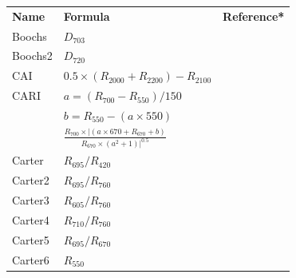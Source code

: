 \documentclass[letterpaper, peerreview, draftcls]{IEEEtran}
\begin{document}
\begingroup\scriptsize
\setlength\tabcolsep{4pt}  %
\begin{xtabular*}{0.3\textwidth}{lll}
	\bfseries{Name} & \bfseries{Formula}                                                                                  & \bfseries{Reference*}      \\
	Boochs          & $D_{703}$                                                                                           & \cite{boochs1990}       \\
	Boochs2         & $D_{720}$                                                                                           & \cite{boochs1990}       \\
	CAI             & $0.5 \times (R_{2000} + R_{2200}) -R_{2100}$                                                        & \cite{nagler2003}       \\
	\midrule
	CARI            & $a = (R_{700}-R_{550}) / 150$                                                                       & \cite{walthall1994}          \\
	& $b = R_{550}-(a\times 550)$                                                                                         &                                  \\
	& $\frac{R_{700}\times | (a\times 670+R_{670}+b)}{R_{670}\times(a^2+1)| ^{0.5}}$                                      &                                  \\
	\midrule
	Carter          & $R_{695}/R_{420}$                                                                                   & \cite{carter1994}              \\
	Carter2         & $R_{695}/R_{760}$                                                                                   & \cite{carter1994}              \\
	Carter3         & $R_{605}/R_{760}$                                                                                   & \cite{carter1994}              \\
	Carter4         & $R_{710}/R_{760}$                                                                                   & \cite{carter1994}              \\
	Carter5         & $R_{695}/R_{670}$                                                                                   & \cite{carter1994}              \\
	Carter6         & $R_{550}$                                                                                           & \cite{carter1994}              \\

\end{xtabular*}
\end{document}
